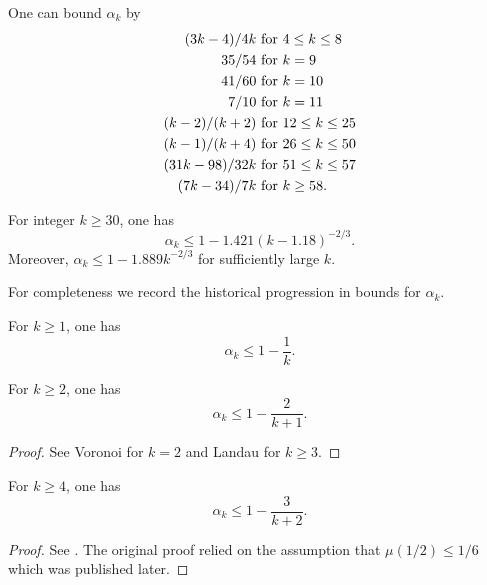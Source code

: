 \begin{theorem}\label{ivic-alpha}\cite[Theorem 13.12]{ivic}  One can bound $\alpha_k$ by
    \begin{align*}
        (3k-4)/4k & \hbox{ for } 4 \leq k \leq 8 \\
        35/54 & \hbox{ for } k = 9 \\
        41/60 & \hbox{ for } k = 10 \\
        7/10 & \hbox{ for } k = 11 \\
        (k-2)/(k+2) & \hbox{ for } 12 \leq k \leq 25 \\
        (k-1)/(k+4) & \hbox{ for } 26 \leq k \leq 50 \\
        (31k-98)/32k & \hbox{ for } 51 \leq k \leq 57 \\
        (7k-34)/7k & \hbox{ for } k \geq 58.
    \end{align*}
\end{theorem}

\begin{theorem}\label{bellotti}  \cite{bellotti_generalised_2023} For integer $k \ge 30$, one has
\[
\alpha_k \leq 1 - 1.421(k - 1.18)^{-2/3}.
\]
Moreover, $\alpha_k \leq 1 - 1.889k^{-2/3}$ for sufficiently large $k$.
\end{theorem}

For completeness we record the historical progression in bounds for $\alpha_k$.

\begin{lemma}\label{piltz-alpha}
    For $k \ge 1$, one has
\[
\alpha_k \le 1 - \frac{1}{k}.
\]
\end{lemma}
\begin{lemma}\label{voronoi-alpha}
For $k \ge 2$, one has
\[
\alpha_k \leq 1 - \frac{2}{k + 1}.
\]
\end{lemma}
\begin{proof}
See Voronoi \cite{voronoi_sur_1903} for $k = 2$ and Landau \cite{landau_uber_1912} for $k \ge 3$.
\end{proof}

\begin{lemma}\label{hl-alpha}
For $k \ge 4$, one has
\[
\alpha_k \leq 1 - \frac{3}{k + 2}.
\]
\end{lemma}
\begin{proof}
See \cite{hardy_littlewood_approximate_1923}. The original proof relied on the assumption that $\mu(1/2) \le 1/6$ which was published later.
\end{proof}

